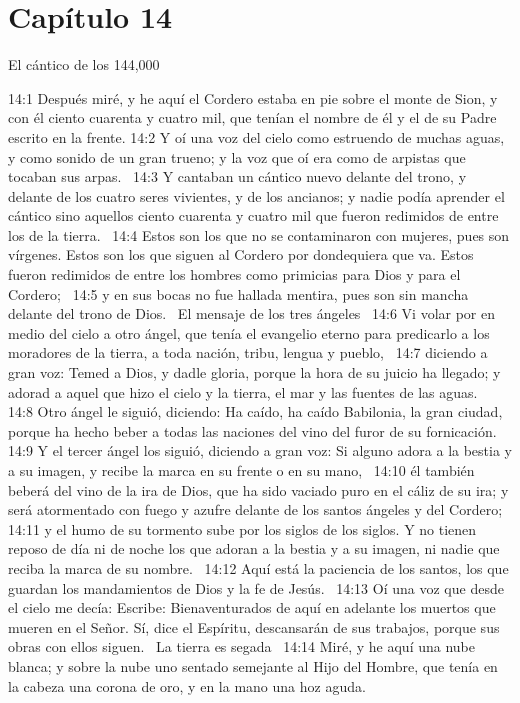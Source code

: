 \section*{Capítulo 14}
El cántico de los 144,000  

14:1 Después miré, y he aquí el Cordero estaba en pie sobre el monte de Sion, y con él ciento cuarenta y cuatro mil, que tenían el nombre de él y el de su Padre escrito en la frente. 
14:2 Y oí una voz del cielo como estruendo de muchas aguas, y como sonido de un gran trueno; y la voz que oí era como de arpistas que tocaban sus arpas.  
14:3 Y cantaban un cántico nuevo delante del trono, y delante de los cuatro seres vivientes, y de los ancianos; y nadie podía aprender el cántico sino aquellos ciento cuarenta y cuatro mil que fueron redimidos de entre los de la tierra.  
14:4 Estos son los que no se contaminaron con mujeres, pues son vírgenes. Estos son los que siguen al Cordero por dondequiera que va. Estos fueron redimidos de entre los hombres como primicias para Dios y para el Cordero;  
14:5 y en sus bocas no fue hallada mentira, pues son sin mancha delante del trono de Dios.  
El mensaje de los tres ángeles  
14:6 Vi volar por en medio del cielo a otro ángel, que tenía el evangelio eterno para predicarlo a los moradores de la tierra, a toda nación, tribu, lengua y pueblo,  
14:7 diciendo a gran voz: Temed a Dios, y dadle gloria, porque la hora de su juicio ha llegado; y adorad a aquel que hizo el cielo y la tierra, el mar y las fuentes de las aguas.  
14:8 Otro ángel le siguió, diciendo: Ha caído, ha caído Babilonia, la gran ciudad, porque ha hecho beber a todas las naciones del vino del furor de su fornicación.  
14:9 Y el tercer ángel los siguió, diciendo a gran voz: Si alguno adora a la bestia y a su imagen, y recibe la marca en su frente o en su mano,  
14:10 él también beberá del vino de la ira de Dios, que ha sido vaciado puro en el cáliz de su ira; y será atormentado con fuego y azufre delante de los santos ángeles y del Cordero;  
14:11 y el humo de su tormento sube por los siglos de los siglos. Y no tienen reposo de día ni de noche los que adoran a la bestia y a su imagen, ni nadie que reciba la marca de su nombre.  
14:12 Aquí está la paciencia de los santos, los que guardan los mandamientos de Dios y la fe de Jesús.  
14:13 Oí una voz que desde el cielo me decía: Escribe: Bienaventurados de aquí en adelante los muertos que mueren en el Señor. Sí, dice el Espíritu, descansarán de sus trabajos, porque sus obras con ellos siguen.  
La tierra es segada  
14:14 Miré, y he aquí una nube blanca; y sobre la nube uno sentado semejante al Hijo del Hombre, que tenía en la cabeza una corona de oro, y en la mano una hoz aguda.  
